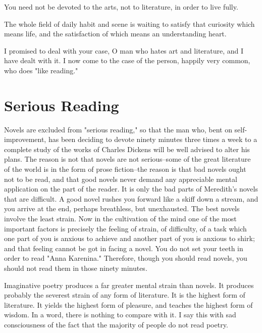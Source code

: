You need not be devoted to the arts, not to literature, in order to
live fully.

The whole field of daily habit and scene is waiting to satisfy that
curiosity which means life, and the satisfaction of which means an
understanding heart.

I promised to deal with your case, O man who hates art and literature,
and I have dealt with it.  I now come to the case of the person,
happily very common, who does "like reading."



\addtocounter{chapter}{1}\chapter*{Serious Reading}

Novels are excluded from "serious reading," so that the man who, bent
on self-improvement, has been deciding to devote ninety minutes three
times a week to a complete study of the works of Charles Dickens will
be well advised to alter his plans.  The reason is not that novels are
not serious--some of the great literature of the world is in the form
of prose fiction--the reason is that bad novels ought not to be read,
and that good novels never demand any appreciable mental application on
the part of the reader. It is only the bad parts of Meredith's novels
that are difficult.  A good novel rushes you forward like a skiff down
a stream, and you arrive at the end, perhaps breathless, but
unexhausted.  The best novels involve the least strain.  Now in the
cultivation of the mind one of the most important factors is precisely
the feeling of strain, of difficulty, of a task which one part of you
is anxious to achieve and another part of you is anxious to shirk; and
that feeling cannot be got in facing a novel.  You do not set your
teeth in order to read "Anna Karenina."  Therefore, though you should
read novels, you should not read them in those ninety minutes.

Imaginative poetry produces a far greater mental strain than novels. It
produces probably the severest strain of any form of literature. It is
the highest form of literature.  It yields the highest form of
pleasure, and teaches the highest form of wisdom.  In a word, there is
nothing to compare with it.  I say this with sad consciousness of the
fact that the majority of people do not read poetry.

